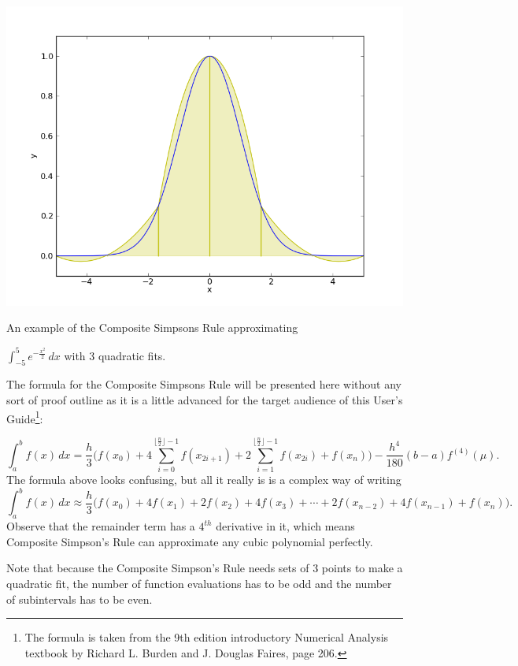 \documentclass[12pt]{article}
\newcommand{\integral}[3]{\text{$\int^{#2}_{#1} #3\,dx$}}
\newcommand{\summation}[3]{\text{$\sum^{#2}_{#1} #3$}}
\newcommand{\floor}[1]{\text{$\lfloor#1\rfloor$}}
\begin{document}
\begin{center} \includegraphics[scale = 0.5]{gaussianSimpsons.png} 

\small An example of the Composite Simpsons Rule approximating 

$\integral{-5}{5}{e^{-\frac{x^2}{2}}}$ with 3 quadratic fits.\normalsize
\end{center}
The formula for the Composite Simpsons Rule will be presented here without any sort of proof outline as it is a little advanced for the target audience of this User's Guide\footnote{The formula is taken from the 9th edition introductory Numerical Analysis textbook by Richard L. Burden and J. Douglas Faires, page 206.}:

\begin{equation*}  \integral{a}{b}{f(x)} = \frac{h}{3}\Big(f(x_0) + 4\summation{i=0}{\floor{\frac{n}{2}}-1}{f(x_{2i+1})} + 2\summation{i=1}{\floor{\frac{n}{2}}-1}{f(x_{2i})} + f(x_n)\Big) - \frac{h^4}{180}(b-a)f^{(4)}(\mu). 
\end{equation*}
The formula above looks confusing, but all it really is is a complex way of writing
\begin{equation*}  \integral{a}{b}{f(x)} \approx \frac{h}{3}\big(f(x_0) + 4f(x_1)+2f(x_2)+4f(x_3)+\cdots+2f(x_{n-2})+4f(x_{n-1})+f(x_n)\big).
\end{equation*}
Observe that the remainder term has a $4^{th}$ derivative in it, which means Composite Simpson's Rule can approximate any cubic polynomial perfectly.

Note that because the Composite Simpson's Rule needs sets of 3 points to make a quadratic fit, the number of function evaluations has to be odd and the number of subintervals has to be even.
\end{document}
